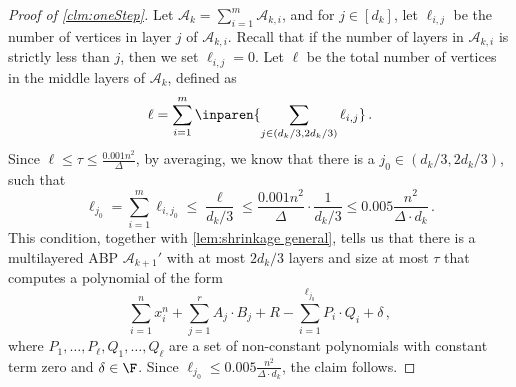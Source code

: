 \begin{proof}[Proof of \autoref{clm:oneStep}]
	Let $\mathcal{A}_k = \sum_{i=1}^{m} \mathcal{A}_{k,i}$, and for $j \in [d_k]$, let $\ell_{i,j}$ be the number of vertices in layer $j$ of $\mathcal{A}_{k,i}$. Recall that if the number of layers in $\mathcal{A}_{k,i}$ is strictly less than $j$, then we set $\ell_{i,j} = 0$. Let $\ell$ be the total number of vertices in the middle layers of $\mathcal{A}_k$, defined as 
	\[ \ell = \sum_{i=1}^{m} \inparen{\sum_{j \in (d_k/3, 2d_k/3)} \ell_{i,j}} \, .\] 
	Since $\ell \leq \tau \leq \frac{0.001 n^2}{\Delta }$, by averaging, we know that there is a $j_0 \in (d_k/3, 2d_k/3)$, such that 
	\[
		\ell_{j_0} = \sum_{i=1}^{m}\ell_{i,{j_0}} \leq \frac{\ell}{d_k/3} \leq \frac{0.001 n^2}{\Delta } \cdot \frac{1}{d_k/3} \leq 0.005\frac{n^2}{\Delta \cdot d_k} \, .
	\]
	This condition, together with \autoref{lem:shrinkage general}, tells us that there is a multilayered ABP  $\mathcal{A}_{k+1}'$ with at most $2d_k/3$ layers and size at most $\tau$ that computes a polynomial of the form
	\[
		\sum_{i = 1}^n x_i^n + \sum_{j = 1}^r A_j\cdot B_j + R - \sum_{i=1}^{\ell_{j_0}} P_i \cdot Q_i + \delta \, , 
	\]
	where  $P_1, \ldots, P_{\ell}, Q_1, \ldots, Q_{\ell}$ are a set of non-constant polynomials with constant term zero and $\delta \in \F$. Since $\ell_{j_0} \leq 0.005\frac{n^2}{\Delta \cdot d_k}$, the claim follows.	
\end{proof}


